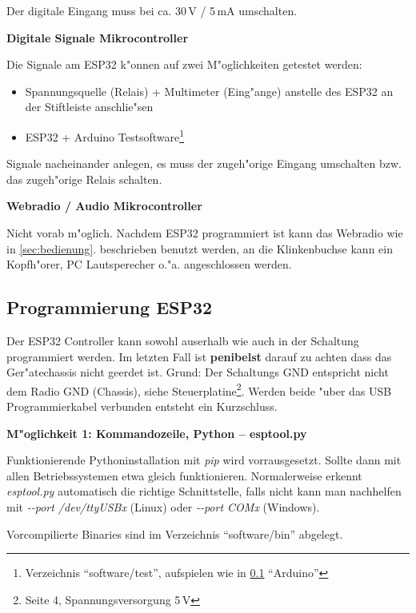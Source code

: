 \documentclass[ngerman,11pt,parskip=half] {scrartcl}
\begin{document}
Der digitale Eingang muss bei ca. 30\,V / 5\,mA umschalten.

\textbf{Digitale Signale Mikrocontroller}

Die Signale am ESP32 k"onnen auf zwei M"oglichkeiten getestet werden:
\begin{itemize}
\item Spannungsquelle (Relais) + Multimeter (Eing"ange) anstelle des ESP32 an der Stiftleiste anschlie"sen
\item ESP32 + Arduino Testsoftware\footnote{Verzeichnis "`software/test"', aufspielen wie in \ref{sec:aufbau:programmierung} "`Arduino"'}
\end{itemize}

Signale nacheinander anlegen, es muss der zugeh"orige Eingang umschalten bzw. das zugeh"orige Relais schalten.

\textbf{Webradio / Audio Mikrocontroller}

Nicht vorab m"oglich. Nachdem ESP32 programmiert ist kann das Webradio wie in \ref{sec:bedienung}. beschrieben benutzt werden, an die Klinkenbuchse kann ein Kopfh"orer, PC Lautsperecher o."a. angeschlossen werden.

\subsection{Programmierung ESP32} \label{sec:aufbau:programmierung}

Der ESP32 Controller kann sowohl auserhalb wie auch in der Schaltung programmiert werden. Im letzten Fall ist \textbf{\color{red} penibelst} darauf zu achten dass das Ger"atechassis nicht geerdet ist. Grund: Der Schaltungs GND entspricht nicht dem Radio GND (Chassis), siehe Steuerplatine\footnote{Seite 4, Spannungsversorgung 5\,V}. Werden beide "uber das USB Programmierkabel verbunden entsteht ein Kurzschluss.

\textbf{M"oglichkeit 1: Kommandozeile, Python -- esptool.py}

Funktionierende Pythoninstallation mit \emph{pip} wird vorrausgesetzt. Sollte dann mit allen Betriebssystemen etwa gleich funktionieren. Normalerweise erkennt \emph{esptool.py} automatisch die richtige Schnittstelle, falls nicht kann man nachhelfen mit \emph{-{}-port /dev/ttyUSBx} (Linux) oder \emph{-{}-port COMx} (Windows).

Vorcompilierte Binaries sind im Verzeichnis "`software/bin"' abgelegt.
\end{document}

